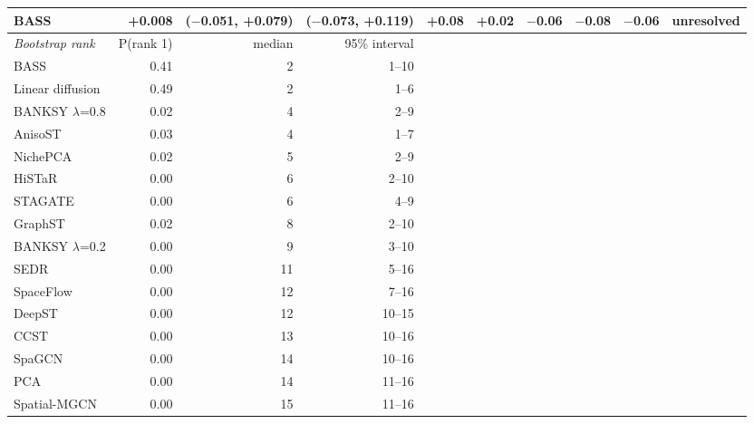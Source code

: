 \begin{tabular}{lrrrrrrrrl}
BASS & +0.008 & ($-$0.051, +0.079) & ($-$0.073, +0.119) & +0.08 & +0.02 & $-$0.06 & $-$0.08 & $-$0.06 & unresolved \\
\midrule
\emph{Bootstrap rank} & P(rank 1) & median & 95\% interval &  &  &  &  &  &  \\
BASS & 0.41 & 2 & 1--10 &  &  &  &  &  &  \\
Linear diffusion & 0.49 & 2 & 1--6 &  &  &  &  &  &  \\
BANKSY $\lambda$=0.8 & 0.02 & 4 & 2--9 &  &  &  &  &  &  \\
AnisoST & 0.03 & 4 & 1--7 &  &  &  &  &  &  \\
NichePCA & 0.02 & 5 & 2--9 &  &  &  &  &  &  \\
HiSTaR & 0.00 & 6 & 2--10 &  &  &  &  &  &  \\
STAGATE & 0.00 & 6 & 4--9 &  &  &  &  &  &  \\
GraphST & 0.02 & 8 & 2--10 &  &  &  &  &  &  \\
BANKSY $\lambda$=0.2 & 0.00 & 9 & 3--10 &  &  &  &  &  &  \\
SEDR & 0.00 & 11 & 5--16 &  &  &  &  &  &  \\
SpaceFlow & 0.00 & 12 & 7--16 &  &  &  &  &  &  \\
DeepST & 0.00 & 12 & 10--15 &  &  &  &  &  &  \\
CCST & 0.00 & 13 & 10--16 &  &  &  &  &  &  \\
SpaGCN & 0.00 & 14 & 10--16 &  &  &  &  &  &  \\
PCA & 0.00 & 14 & 11--16 &  &  &  &  &  &  \\
Spatial-MGCN & 0.00 & 15 & 11--16 &  &  &  &  &  &  \\
\bottomrule
\end{tabular}
